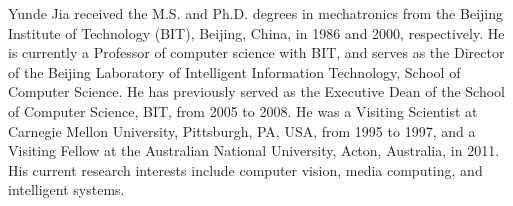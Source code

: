 \documentclass[10pt,journal,cspaper,compsoc]{IEEEtran}
\begin{document}
\begin{IEEEbiography}{Yunde Jia} received the M.S. and Ph.D. degrees in mechatronics from the Beijing Institute of Technology (BIT), Beijing, China, in 1986 and 2000, respectively. He is currently a Professor of computer science with BIT, and serves as the Director of the Beijing Laboratory of Intelligent Information Technology, School of Computer Science. He has previously served as the Executive Dean of the School of Computer Science, BIT, from 2005 to 2008. He was a Visiting Scientist at Carnegie Mellon University, Pittsburgh, PA, USA, from 1995 to 1997, and a Visiting Fellow at the Australian National University, Acton, Australia, in 2011. His current research
interests include computer vision, media computing, and intelligent systems.
\end{IEEEbiography}
\end{document}

